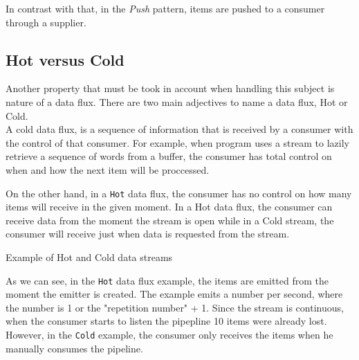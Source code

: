 	In contrast with that, in the \textit{Push} pattern, items are pushed to a consumer through a supplier.





	\subsection{Hot versus Cold}
	
	Another property that must be took in account when handling this subject is nature of a data flux. There are two main adjectives to name a data flux, Hot or Cold.  \\

	A cold data flux, is a sequence of information that is received by a consumer with the control of that consumer. 
	For example, when program uses a stream to lazily retrieve a sequence of words from a buffer, the consumer has total control on when and how the next item will be proccessed.

	On the other hand, in a \texttt{Hot} data flux, the consumer has no control on how many items will receive in the given moment. 
	In a Hot data flux, the consumer can  receive data from the moment the stream is open while in a Cold stream, the consumer will receive just when data is requested from the stream.

	\begin{figure3}
		\centering
		\begin{subfigure}[h]{0.4\textwidth}
			\centering
			\caption{}
		 \end{subfigure}	
	\qquad\qquad
		 \begin{subfigure}[h]{0.4\textwidth}
			\centering
			\caption{}
		\end{subfigure}		
	  \caption{Example of Hot and Cold data streams}
	  \label{fig:exmplo3}
	\end{figure3}

	As we can see, in the \texttt{Hot} data flux example, the items are emitted from the moment the emitter is created. 
	The example emits a number per second, where the number is 1 or the "repetition number" + 1. Since the stream is continuous, when the consumer starts to listen the pipepline 10 items were already lost.
	However, in the \texttt{Cold} example, the consumer only receives the items when he manually consumes the pipeline.

